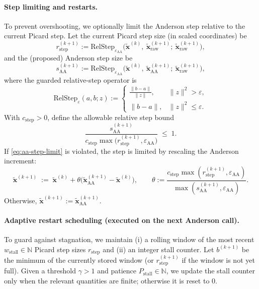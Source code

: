 \paragraph{Step limiting and restarts.}
To prevent overshooting, we optionally limit the Anderson step relative to the current Picard step.
Let the current Picard step size (in scaled coordinates) be
\[
r_{\mathrm{step}}^{(k+1)} := \mathrm{RelStep}_{\varepsilon_{\mathrm{AA}}}\!\Big(\widetilde{\mathbf{x}}^{(k)},\ \widetilde{\mathbf{x}}_{\mathrm{raw}}^{(k+1)};\ \widetilde{\mathbf{x}}_{\mathrm{raw}}^{(k+1)}\Big),
\]
and the (proposed) Anderson step size be
\[
s_{\mathrm{AA}}^{(k+1)} := \mathrm{RelStep}_{\varepsilon_{\mathrm{AA}}}\!\Big(\widetilde{\mathbf{x}}^{(k)},\ \widetilde{\mathbf{x}}_{\mathrm{AA}}^{(k+1)};\ \widetilde{\mathbf{x}}_{\mathrm{raw}}^{(k+1)}\Big),
\]
where the guarded relative-step operator is
\[
\mathrm{RelStep}_{\varepsilon}(a,b;z):=
\begin{cases}
\displaystyle \frac{\|b-a\|}{\|z\|}, & \|z\|^2>\varepsilon,\\[1.0ex]
\displaystyle \|b-a\|, & \|z\|^2\le \varepsilon.
\end{cases}
\]
With $c_{\mathrm{step}}>0$, define the allowable relative step bound
\begin{equation}\label{eq:aa-step-limit}
\frac{s_{\mathrm{AA}}^{(k+1)}}{c_{\mathrm{step}}\max\!\big(r_{\mathrm{step}}^{(k+1)},\varepsilon_{\mathrm{AA}}\big)} \;\le\; 1.
\end{equation}
If \eqref{eq:aa-step-limit} is violated, the step is limited by rescaling the Anderson increment:
\[
\widetilde{\mathbf{x}}^{(k+1)} \;:=\; \widetilde{\mathbf{x}}^{(k)} +
\theta\Big(\widetilde{\mathbf{x}}_{\mathrm{AA}}^{(k+1)}-\widetilde{\mathbf{x}}^{(k)}\Big),
\qquad 
\theta := \frac{c_{\mathrm{step}}\max(r_{\mathrm{step}}^{(k+1)},\varepsilon_{\mathrm{AA}})}{\max(s_{\mathrm{AA}}^{(k+1)},\varepsilon_{\mathrm{AA}})}.
\]
Otherwise, $\widetilde{\mathbf{x}}^{(k+1)}:=\widetilde{\mathbf{x}}_{\mathrm{AA}}^{(k+1)}$.

\paragraph{Adaptive restart scheduling (executed on the next Anderson call).}
To guard against stagnation, we maintain (i) a rolling window of the most recent $w_{\mathrm{stall}}\in\mathbb{N}$ Picard step sizes $r_{\mathrm{step}}$ and (ii) an integer stall counter. Let $b^{(k+1)}$ be the minimum of the currently stored window (or $r_{\mathrm{step}}^{(k+1)}$ if the window is not yet full). Given a threshold $\gamma>1$ and patience $P_{\mathrm{stall}}\in\mathbb{N}$, we update the stall counter only when the relevant quantities are finite; otherwise it is reset to $0$.

